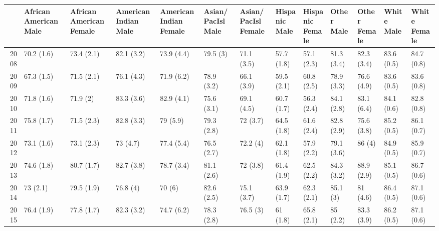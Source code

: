 \documentclass{article}\usepackage[]{graphicx}\usepackage[]{color}
\begin{document}
\begin{landscape}
\begin{table}[ht]
\centering
\begin{tabular}{rllllllllllll}
  \hline
 & \thead{African American\\Male} & \thead{African American\\Female} & \thead{American Indian\\Male} & \thead{American Indian\\Female} & \thead{Asian/PacIsl\\Male} & \thead{Asian/PacIsl\\Female} & \thead{Hispanic\\Male} & \thead{Hispanic\\Female} & \thead{Other\\Male} & \thead{Other\\Female} & \thead{White\\Male} & \thead{White\\Female} \\
  \hline
2008 & 70.2 (1.6) & 73.4 (2.1) & 82.1 (3.2) & 73.9 (4.4) & 79.5 (3) & 71.1 (3.5) & 57.7 (1.8) & 57.1 (2.3) & 81.3 (3.4) & 82.3 (3.4) & 83.6 (0.5) & 84.7 (0.8) \\
  2009 & 67.3 (1.5) & 71.5 (2.1) & 76.1 (4.3) & 71.9 (6.2) & 78.9 (3.2) & 66.1 (3.9) & 59.5 (2.1) & 60.8 (2.5) & 78.9 (3.3) & 76.6 (4.9) & 83.6 (0.5) & 83.6 (0.8) \\
  2010 & 71.8 (1.6) & 71.9 (2) & 83.3 (3.6) & 82.9 (4.1) & 75.6 (3.1) & 69.1 (4.5) & 60.7 (1.7) & 56.3 (2.4) & 84.1 (2.8) & 83.1 (6.4) & 84.1 (0.6) & 82.8 (0.8) \\
  2011 & 75.8 (1.7) & 71.5 (2.3) & 82.8 (3.3) & 79 (5.9) & 79.3 (2.8) & 72 (3.7) & 64.5 (1.8) & 61.6 (2.4) & 82.8 (2.9) & 75.6 (3.8) & 85.2 (0.5) & 86.1 (0.7) \\
  2012 & 73.1 (1.6) & 73.1 (2.3) & 73 (4.7) & 77.4 (5.4) & 76.5 (2.7) & 72.2 (4) & 62.1 (1.8) & 57.9 (2.2) & 79.1 (3.6) & 86 (4) & 84.9 (0.5) & 85.9 (0.7) \\
  2013 & 74.6 (1.8) & 80.7 (1.7) & 82.7 (3.8) & 78.7 (3.4) & 81.1 (2.6) & 72 (3.8) & 61.4 (1.9) & 62.5 (2.2) & 84.3 (3.2) & 88.9 (2.9) & 85.1 (0.5) & 86.7 (0.6) \\
  2014 & 73 (2.1) & 79.5 (1.9) & 76.8 (4) & 70 (6) & 82.6 (2.5) & 75.1 (3.7) & 63.9 (1.7) & 62.3 (2.1) & 85.1 (3) & 81 (4.6) & 86.4 (0.5) & 87.1 (0.6) \\
  2015 & 76.4 (1.9) & 77.8 (1.7) & 82.3 (3.2) & 74.7 (6.2) & 78.3 (2.8) & 76.5 (3) & 61 (1.8) & 65.8 (2.1) & 85 (2.2) & 83.3 (3.9) & 86.2 (0.5) & 87.1 (0.6) \\

\end{tabular}
\end{table}
\end{landscape}
\end{document}
